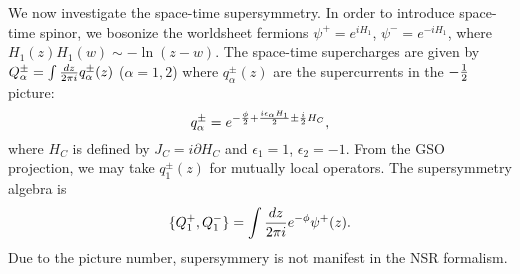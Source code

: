 \documentclass[a4paper,12pt]{article}
\begin{document}
We now investigate the space-time supersymmetry. 
In order to introduce space-time spinor, we bosonize the
worldsheet fermions $\psi^{+}=e^{i H_{1}}$, $\psi^{-}=e^{-i H_{1}}$,
where $H_{1}(z)H_{1}(w)\sim-\ln(z-w)$. 
The space-time supercharges are given by
$Q_{\alpha}^{\pm}=\int {dz\over2\pi i} q_{\alpha}^{\pm}(z)$ ($\alpha=1,2$)
where $q_{\alpha}^{\pm}(z)$ are the supercurrents
in the $-{1\over2}$ picture:
\begin{equation}
 q_{\alpha}^{\pm}=e^{-{\phi\over2}+{i\epsilon_\alpha H_{1}\over2}
\pm {i\over2}H_{C}}, 
\end{equation}
where $H_{C}$ is defined by $J_{C}=i\partial H_{C}$ and $\epsilon_1=1$, 
$\epsilon_2=-1$.
{}From the GSO projection, we may take $q_{1}^{\pm}(z)$ for mutually 
local operators.
The supersymmetry algebra is 
\begin{equation}
 \{ Q^{+}_{1}, Q^{-}_{1}\}=\int {dz\over 2\pi i}
e^{-\phi}\psi^{+}(z).
\end{equation}
Due to the picture number, supersymmery is not manifest
in the NSR formalism. 
\end{document}
